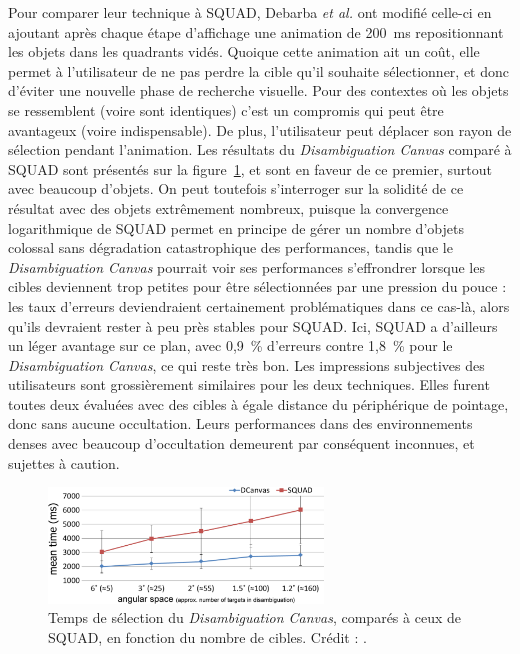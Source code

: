 	Pour comparer leur technique à SQUAD, Debarba \emph{et al.} ont modifié celle-ci en ajoutant après chaque étape \og d'affichage \fg{} une animation de 200~ms repositionnant les objets dans les quadrants vidés. Quoique cette animation ait un coût, elle permet à l'utilisateur de ne pas perdre la cible qu'il souhaite sélectionner, et donc d'éviter une nouvelle phase de recherche visuelle. Pour des contextes où les objets se ressemblent (voire sont identiques) c'est un compromis qui peut être avantageux (voire indispensable). De plus, l'utilisateur peut déplacer son rayon de sélection pendant l'animation. Les résultats du \emph{Disambiguation Canvas} comparé à SQUAD sont présentés sur la figure~\ref{fig:dCanvasSPerf}, et sont en faveur de ce premier, surtout avec beaucoup d'objets. On peut toutefois s'interroger sur la solidité de ce résultat avec des objets extrêmement nombreux, puisque la convergence logarithmique de SQUAD permet en principe de gérer un nombre d'objets colossal sans dégradation catastrophique des performances, tandis que le \emph{Disambiguation Canvas} pourrait voir ses performances s'effrondrer lorsque les cibles deviennent trop petites pour être sélectionnées par une pression du pouce : les taux d'erreurs deviendraient certainement problématiques dans ce cas-là, alors qu'ils devraient rester à peu près stables pour SQUAD. Ici, SQUAD a d'ailleurs un léger avantage sur ce plan, avec 0,9~\%{} d'erreurs contre 1,8~\%{} pour le \emph{Disambiguation Canvas}, ce qui reste très bon. Les impressions subjectives des utilisateurs sont grossièrement similaires pour les deux techniques. Elles furent toutes deux évaluées avec des cibles à égale distance du périphérique de pointage, donc sans aucune occultation. Leurs performances dans des environnements denses avec beaucoup d'occultation demeurent par conséquent inconnues, et sujettes à caution.
	
	\begin{figure}[htbp]
		\centering
		\includegraphics[width=0.65\textwidth]{figures/ch2/dCanvasSPerf}
		\caption[\emph{Disambiguation Canvas} -- performances II]{Temps de sélection du \emph{Disambiguation Canvas}, comparés à ceux de SQUAD, en fonction du nombre de cibles. Crédit : \cite{debarba2013disambiguation}.}
		\label{fig:dCanvasSPerf}
	\end{figure}

